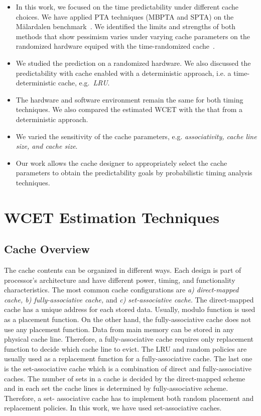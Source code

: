 \begin{itemize}

\item{In this work, we focused on the time predictability under different cache choices. We have applied PTA techniques (MBPTA and SPTA) on the M{\"a}lardalen benchmark~\cite{mrtc:bench}. We identified the limits and strengths of both methods that show pessimism varies under varying cache parameters on the randomized hardware equiped with the time-randomized cache~\cite{anwar2015probabilistically}}.

\item{We studied the prediction on a randomized hardware. We also discussed the predictability with cache enabled with a deterministic approach, i.e. a time-deterministic cache, e.g.~\textit{LRU}}.

\item{The hardware and software environment remain the same for both timing techniques. We also compared the estimated WCET with the that from a deterministic approach}. \item{We  varied the sensitivity of the cache parameters, e.g. \textit{associativity, cache line size, and cache size}}.

\item{Our work allows the cache designer to appropriately select the
cache parameters to obtain the predictability goals by
probabilistic timing analysis techniques}.
\end{itemize}

 


\section{WCET Estimation Techniques}
\label{WET}
\subsection{Cache Overview}

The cache contents can be organized in different ways.  Each design is  part of processor's architecture and have different power, timing, and functionality characteristics. The most common cache configurations are \textit{a) direct-mapped cache, b) fully-associative cache,} and  \textit{c) set-associative cache}. The direct-mapped cache has a unique address for each stored data. Usually, modulo function is used as a placement function. On the other hand, the fully-associative cache does not use any placement function. Data from main memory can be stored in any physical cache line. Therefore, a fully-associative cache requires only replacement function to decide which cache line to evict. The LRU and random policies are usually used as a replacement function for a fully-associative cache. The last one is the set-associative cache which is a combination of direct and fully-associative caches. The number of sets in a cache is decided by the direct-mapped scheme and in each set the cache lines is determined by fully-associative scheme. Therefore, a set- associative cache has to implement both random placement and  replacement policies.  In this work, we have used set-associative caches. 
